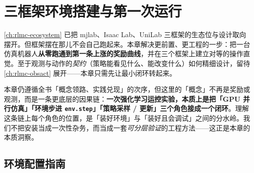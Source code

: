 \chapter{三框架环境搭建与第一次运行}\label{ch:rlmc-setup}


\cref{ch:rlmc-ecosystem} 已把 mjlab、Isaac Lab、UniLab 三框架的生态位与设计取向摆开。但框架摆在那儿不会自己跑起来。本章解决更前置、更工程的一步：把一台仿真机器人\textbf{从零跑通到第一条上涨的奖励曲线}，并在三个框架上建立对等的操作直觉。至于观测与动作的\emph{契约}（策略能看见什么、能改变什么）如何精细设计，留待 \cref{ch:rlmc-obsact} 展开——本章只需先让最小闭环转起来。

本章仍遵循全书「概念领路、实践兑现」的次序，但这里的「概念」不再是奖励或观测，而是一条更底层的因果链：\textbf{一次强化学习运控实验，本质上是把「GPU 并行仿真」「环境步进 \texttt{env.step}」「策略采样 / 更新」三个角色接成一个闭环}。理解这条链上每个角色的位置，是「装好环境」与「装好且会调试」之间的分水岭。我们不把安装当成一次性杂务，而当成一套\emph{可分层验证}的工程方法——这正是本章的本质洞察。

\section{环境配置指南}
\label{sec:rlmc-setup-prep}

